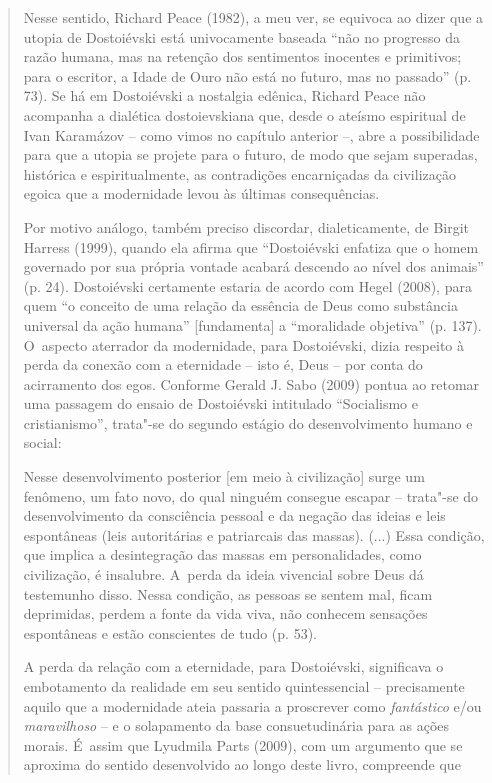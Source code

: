 {\begin{quote}
Nesse sentido, Richard Peace (1982), a meu ver, se equivoca ao dizer que
a utopia de Dostoiévski está univocamente baseada ``não no progresso da
razão humana, mas na retenção dos sentimentos inocentes e primitivos;
para o escritor, a Idade de Ouro não está no futuro, mas no passado''
(p. 73). Se há em Dostoiévski a nostalgia edênica, Richard Peace não
acompanha a dialética dostoievskiana que, desde o ateísmo espiritual de
Ivan Karamázov -- como vimos no capítulo anterior --, abre a
possibilidade para que a utopia se projete para o futuro, de modo que
sejam superadas, histórica e espiritualmente, as contradições
encarniçadas da civilização egoica que a modernidade levou às últimas
consequências.

Por motivo análogo, também preciso discordar, dialeticamente, de Birgit
Harress (1999), quando ela afirma que ``Dostoiévski enfatiza que o homem
governado por sua própria vontade acabará descendo ao nível dos
animais'' (p. 24). Dostoiévski certamente estaria de acordo com Hegel
(2008), para quem ``o conceito de uma relação da essência de Deus como
substância universal da ação humana'' {[}fundamenta{]} a ``moralidade
objetiva'' (p. 137). O~aspecto aterrador da modernidade, para
Dostoiévski, dizia respeito à perda da conexão com a eternidade -- isto
é, Deus -- por conta do acirramento dos egos. Conforme Gerald J. Sabo
(2009) pontua ao retomar uma passagem do ensaio de Dostoiévski
intitulado ``Socialismo e cristianismo'', trata"-se do segundo estágio do
desenvolvimento humano e social:

Nesse desenvolvimento posterior {[}em meio à civilização{]} surge um
fenômeno, um fato novo, do qual ninguém consegue escapar -- trata"-se do
desenvolvimento da consciência pessoal e da negação das ideias e leis
espontâneas (leis autoritárias e patriarcais das massas). (...) Essa
condição, que implica a desintegração das massas em personalidades, como
civilização, é insalubre. A~perda da ideia vivencial sobre Deus dá
testemunho disso. Nessa condição, as pessoas se sentem mal, ficam
deprimidas, perdem a fonte da vida viva, não conhecem sensações
espontâneas e estão conscientes de tudo (p. 53).

A perda da relação com a eternidade, para Dostoiévski, significava o
embotamento da realidade em seu sentido quintessencial -- precisamente
aquilo que a modernidade ateia passaria a proscrever como
\emph{fantástico} e/ou \emph{maravilhoso} -- e o solapamento da base
consuetudinária para as ações morais. É~assim que Lyudmila Parts (2009),
com um argumento que se aproxima do sentido desenvolvido ao longo deste
livro, compreende que


\end{quote}}
